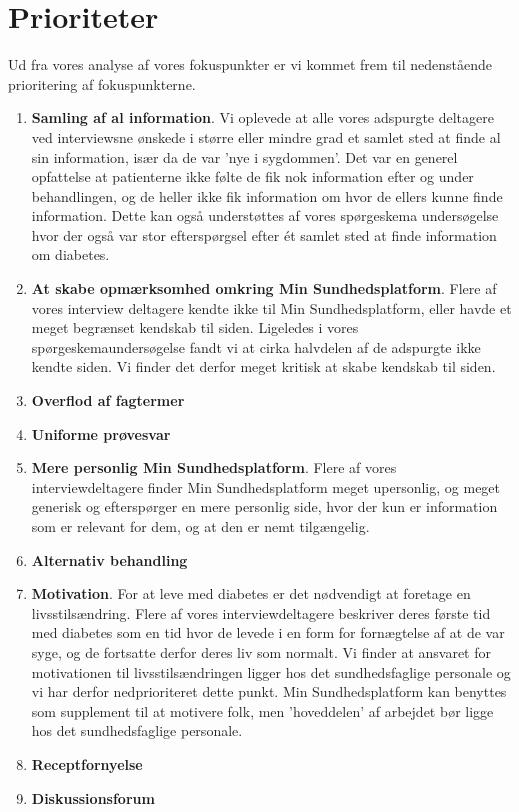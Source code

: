 \section{Prioriteter}
Ud fra vores analyse af vores fokuspunkter er vi kommet frem til nedenstående prioritering af fokuspunkterne.\\
\begin{enumerate}
	\item \textbf{Samling af al information}. Vi oplevede at alle vores adspurgte deltagere ved interviewsne ønskede i større eller mindre grad et samlet sted at finde al sin information, især da de var 'nye i sygdommen'. Det var en generel opfattelse at patienterne ikke følte de fik nok information efter og under behandlingen, og de heller ikke fik information om hvor de ellers kunne finde information. Dette kan også understøttes af vores spørgeskema undersøgelse hvor der også var stor efterspørgsel efter ét samlet sted at finde information om diabetes.
	\item \textbf{At skabe opmærksomhed omkring Min Sundhedsplatform}. Flere af vores interview deltagere kendte ikke til Min Sundhedsplatform, eller havde et meget begrænset kendskab til siden. Ligeledes i vores spørgeskemaundersøgelse fandt vi at cirka halvdelen af de adspurgte ikke kendte siden. Vi finder det derfor meget kritisk at skabe kendskab til siden.
	\item \textbf{Overflod af fagtermer}
	\item \textbf{Uniforme prøvesvar}
	\item \textbf{Mere personlig Min Sundhedsplatform}. Flere af vores interviewdeltagere finder Min Sundhedsplatform meget upersonlig, og meget generisk og efterspørger en mere personlig side, hvor der kun er information som er relevant for dem, og at den er nemt tilgængelig.
	\item \textbf{Alternativ behandling}
	\item \textbf{Motivation}. For at leve med diabetes er det nødvendigt at foretage en livsstilsændring. Flere af vores interviewdeltagere beskriver deres første tid med diabetes som en tid hvor de levede i en form for fornægtelse af at de var syge, og de fortsatte derfor deres liv som normalt. Vi finder at ansvaret for motivationen til livsstilsændringen ligger hos det sundhedsfaglige personale og vi har derfor nedprioriteret dette punkt. Min Sundhedsplatform kan benyttes som supplement til at motivere folk, men 'hoveddelen' af arbejdet bør ligge hos det sundhedsfaglige personale.
	\item \textbf{Receptfornyelse}
	\item \textbf{Diskussionsforum}
\end{enumerate}